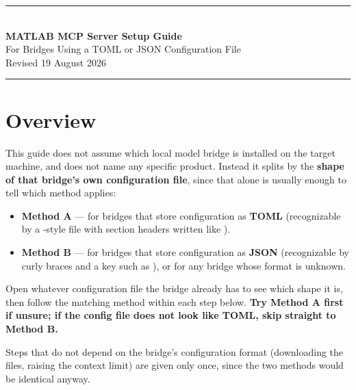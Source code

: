\documentclass[11pt, letterpaper]{article}
\begin{document}

\begin{center}
  \color{TSorange}\rule{\textwidth}{2pt}\\[5pt]
  {\fontsize{18}{22}\selectfont\bfseries\color{TSdark}
    MATLAB MCP Server Setup Guide}\\[4pt]
  {\small\color{TSgray}
    For Bridges Using a TOML or JSON Configuration File}\\[2pt]
  {\small\color{TSgray}
    Revised 19 August 2026}\\[5pt]
  \color{TSorange}\rule{\textwidth}{2pt}
\end{center}

\vspace{6pt}

\section*{Overview}

This guide does not assume which local model bridge is installed on the target machine, and does
not name any specific product. Instead it splits by the \textbf{shape of that bridge's own
configuration file}, since that alone is usually enough to tell which method applies:

\begin{itemize}
  \item {\color{TSblue}\textbf{Method A}} --- for bridges that store configuration as
        \textbf{TOML} (recognizable by a -style file with section headers
        written like ).
  \item {\color{TSmaroon}\textbf{Method B}} --- for bridges that store configuration as
        \textbf{JSON} (recognizable by curly braces and a key such as ),
        or for any bridge whose format is unknown.
\end{itemize}

Open whatever configuration file the bridge already has to see which shape it is, then follow the
matching method within each step below. \textbf{Try Method A first if unsure; if the config file
does not look like TOML, skip straight to Method B.}

\begin{notebox}
  Steps that do not depend on the bridge's configuration format (downloading the files, raising
  the context limit) are given only once, since the two methods would be identical anyway.
\end{notebox}
\end{document}
